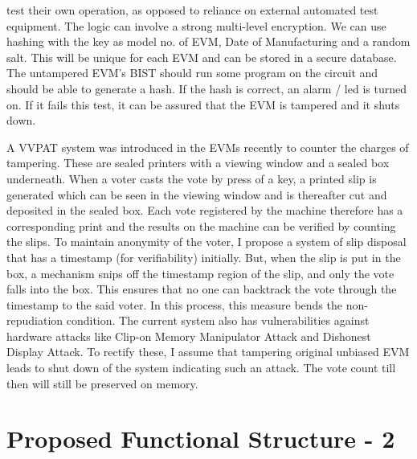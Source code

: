 \documentclass{article}
\begin{document}
test their own operation, as opposed to reliance on external automated test equipment. The logic can involve a strong multi-level encryption. We can use hashing with the key as model no. of EVM, Date of Manufacturing and a random salt. This will be unique for each EVM and can be stored in a secure database. The untampered EVM's BIST should run some program on the circuit and should be able to generate a hash. If the hash is correct, an alarm / led is turned on. If it fails this test, it can be assured that the EVM is tampered and it shuts down. \par
A VVPAT system was introduced in the EVMs recently to counter the charges of tampering. These are sealed printers with a viewing window and a sealed box underneath. When a voter casts the vote by press of a key, a printed slip is generated which can be seen in the viewing window and is thereafter cut and deposited in the sealed box. Each vote registered by the machine therefore has a corresponding print and the results on the machine can be verified by counting the slips. To maintain anonymity of the voter, I propose a system of slip disposal that has a timestamp (for verifiability) initially. But, when the slip is put in the box, a mechanism snips off the timestamp region of the slip, and only the vote falls into the box. This ensures that no one can backtrack the vote through the timestamp to the said voter. In this process, this measure bends the non-repudiation condition. The current system also has vulnerabilities against hardware attacks like Clip-on Memory Manipulator Attack and Dishonest Display Attack. To rectify these, I assume that tampering original unbiased EVM leads to shut down of the system indicating such an attack. The vote count till then will still be preserved on memory.


\section{Proposed Functional Structure - 2}
\end{document}
